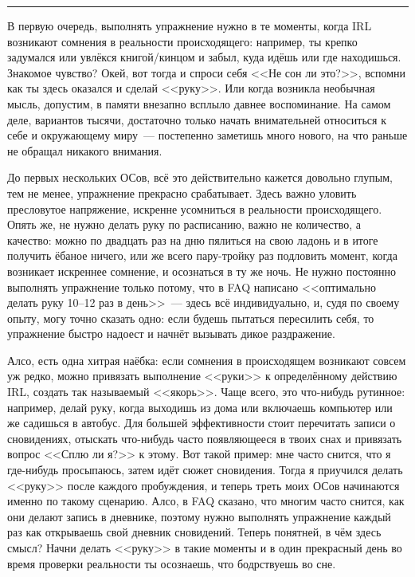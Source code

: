 \documentclass[a5paper,12pt,twoside]{memoir}
\begin{document}
\fancybreak{* * *}

В первую очередь, выполнять упражнение нужно в те моменты, когда IRL возникают сомнения в реальности происходящего: например, ты крепко задумался или увлёкся книгой/кинцом и забыл, куда идёшь или где находишься. Знакомое чувство? Окей, вот тогда и спроси себя <<Не сон ли это?>>, вспомни как ты здесь оказался и сделай <<руку>>. Или когда возникла необычная мысль, допустим, в памяти внезапно всплыло давнее воспоминание. На самом деле, вариантов тысячи, достаточно только начать внимательней относиться к себе и окружающему миру~--- постепенно заметишь много нового, на что раньше не обращал никакого внимания. 

До  первых нескольких ОСов, всё это действительно кажется довольно глупым, тем не менее, упражнение прекрасно срабатывает. Здесь важно уловить пресловутое напряжение, искренне усомниться в реальности происходящего. Опять же, не нужно делать руку по расписанию, важно не количество, а качество: можно по двадцать раз на дню пялиться на свою ладонь и в итоге получить ёбаное ничего,  или же всего пару-тройку раз подловить момент, когда возникает искреннее сомнение, и осознаться в ту же ночь. Не нужно постоянно выполнять упражнение только потому, что в FAQ написано <<оптимально делать руку 10--12 раз в день>>~--- здесь всё индивидуально, и, судя по своему опыту, могу точно сказать одно: если будешь пытаться пересилить себя, то упражнение быстро надоест и начнёт вызывать дикое раздражение.

Алсо, есть одна хитрая наёбка: если сомнения в происходящем возникают совсем уж редко, можно привязать выполнение <<руки>> к определённому действию IRL, создать так называемый <<якорь>>. Чаще всего, это что-нибудь рутинное: например, делай руку, когда выходишь из дома или включаешь компьютер или же садишься в автобус. Для большей эффективности стоит перечитать записи о сновидениях, отыскать что-нибудь часто появляющееся в твоих снах и привязать вопрос <<Сплю ли я?>> к этому. Вот такой пример: мне часто снится, что я где-нибудь просыпаюсь, затем идёт сюжет сновидения. Тогда я приучился делать <<руку>> после каждого пробуждения, и теперь треть моих ОСов начинаются именно по такому сценарию. Алсо, в FAQ сказано, что многим часто снится, как они делают запись в дневнике, поэтому нужно выполнять упражнение каждый раз как открываешь свой дневник сновидений. Теперь понятней, в чём здесь смысл? Начни делать <<руку>> в такие моменты и в один прекрасный день во время проверки реальности ты осознаешь, что бодрствуешь во сне.
\end{document}
